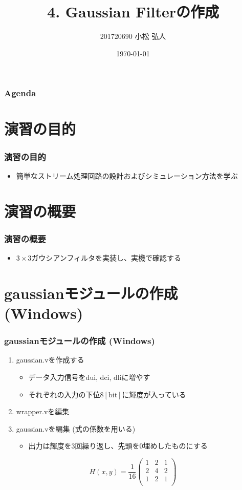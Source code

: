 ﻿\documentclass[dvipdfmx]{beamer}
\title{4. Gaussian Filterの作成}
\author{201720690 小松 弘人}
\date{\today}
\begin{document}
\maketitle

\begin{frame}
	\frametitle{Agenda}
	\tableofcontents
\end{frame}

\section{演習の目的}
\begin{frame}
	\frametitle{演習の目的}
	\begin{itemize}
		\item
			簡単なストリーム処理回路の設計およびシミュレーション方法を学ぶ
	\end{itemize}
\end{frame}

\section{演習の概要}
\begin{frame}
	\frametitle{演習の概要}
	\begin{itemize}
		\item
			$3\!\times\!3$ガウシアンフィルタを実装し、実機で確認する
	\end{itemize}
\end{frame}

\section{gaussianモジュールの作成 (Windows)}
\begin{frame}
	\frametitle{gaussianモジュールの作成 (Windows)}
	\begin{enumerate}
		\item
			gaussian.vを作成する\\
			\begin{itemize}
				\item
					データ入力信号をdui, dci, dliに増やす
				\item
					それぞれの入力の下位$8\mathrm{[bit]}$に輝度が入っている
			\end{itemize}
		\item
			wrapper.vを編集
		\item
			gaussian.vを編集 (式の係数を用いる)
			\begin{itemize}
				\item
					出力は輝度を3回繰り返し、先頭を0埋めしたものにする
			\end{itemize}
	\end{enumerate}
	\begin{equation}
		\label{eq:gaussian}
		H(x, y)\!=\!\frac{1}{16}\!\left(
		\begin{array}{ccc}
			1 & 2 & 1 \\
			2 & 4 & 2 \\
			1 & 2 & 1 \\
		\end{array}
		\right)
	\end{equation}
\end{frame}
\end{document}

